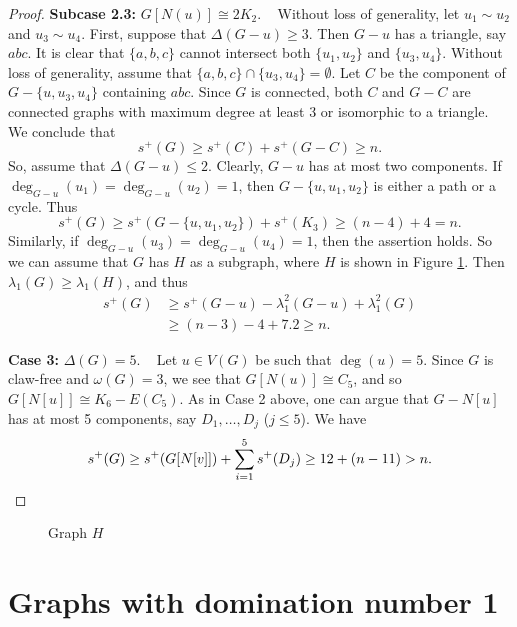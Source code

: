 \documentclass{article}
\begin{document}
\begin{proof}
\textbf{Subcase 2.3:} $G[N(u)]\cong 2K_2$. ~ Without loss of generality, let $u_1\sim u_2$ and $u_3\sim u_4$. First, suppose that $\Delta(G-u)\ge 3$. Then $G-u$ has a triangle, say $abc$. It is clear that $\{a,b,c\}$ cannot intersect both $\{u_1, u_2\}$ and $\{u_3, u_4\}$. Without loss of generality, assume that $\{a,b,c\}\cap \{u_3, u_4\}=\emptyset$. Let $C$ be the component of $G-\{u, u_3, u_4\}$ containing $abc$. Since $G$ is connected, both $C$ and $G-C$ are connected graphs with maximum degree at least 3 or isomorphic to a triangle. We conclude that 
\[ s^+(G)\ge s^+(C) + s^+(G-C)\ge n.\]
So, assume that $\Delta(G-u)\le 2$. Clearly, $G-u$ has at most two components. If $\deg_{G-u}(u_1)=\deg_{G-u}(u_2)=1$, then $G-\{u, u_1,u_2\}$ is either a path or a cycle. Thus 
\[ s^+(G)\ge s^+(G-\{u, u_1,u_2\}) + s^+(K_3)\ge (n-4) + 4=n.\] Similarly, if $\deg_{G-u}(u_3)=\deg_{G-u}(u_4)=1$, then the assertion holds. So we can assume that $G$ has $H$ as a subgraph, where $H$ is shown in Figure \ref{fig:Subcase1_2}. Then $\lambda_1(G)\ge \lambda_1(H)$, and thus 
\begin{align*}
    s^+(G) &\ge s^+(G-u) - \lambda_1^2(G-u) + \lambda_1^2(G) \\
    & \ge (n-3) - 4 + 7.2 \ge n.
\end{align*}

\textbf{Case 3:} $\Delta(G) =5$. ~ Let $u\in V(G)$ be such that $\deg(u)=5$. Since $G$ is claw-free and $\omega(G)=3$, we see that $G[N(u)]\cong C_5$, and so $G[N[u]]\cong K_6 - E(C_5)$. As in Case 2 above, one can argue that $G-N[u]$ has at most 5 components, say $D_1, \ldots, D_j$ ($j\le 5$). We have 
\[ s^+(G) \ge s^+(G[N[v]]) + \sum_{i=1}^5 s^+(D_j)\ge 12 + (n-11) > n. \qedhere\]
\end{proof}

\begin{figure}
\centering
{}
    \caption{Graph $H$}
    \label{fig:Subcase1_2}
\end{figure}


\section{Graphs with domination number 1}
\label{section:domination_1}
\end{document}
